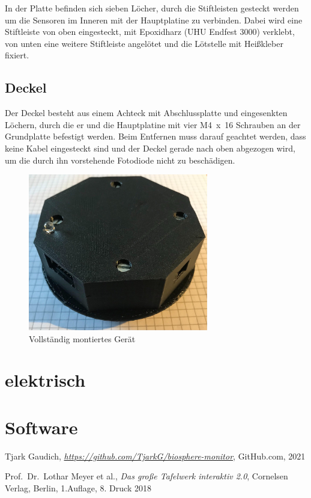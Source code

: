 \documentclass[12pt, a4paper, oneside]{report}
\begin{document}
In der Platte befinden sich sieben Löcher, durch die Stiftleisten gesteckt werden um die Sensoren im Inneren mit der Hauptplatine zu verbinden. Dabei wird eine Stiftleiste von oben eingesteckt, mit Epoxidharz (UHU Endfest 3000) verklebt, von unten eine weitere Stiftleiste angelötet und die Lötstelle mit Heißkleber fixiert.

\section{Deckel}
Der Deckel besteht aus einem Achteck mit Abschlussplatte und eingesenkten Löchern, durch die er und die Hauptplatine mit vier M4~x~16 Schrauben an der Grundplatte befestigt werden. Beim Entfernen muss darauf geachtet werden, dass keine Kabel eingesteckt sind und der Deckel gerade nach oben abgezogen wird, um die durch ihn vorstehende Fotodiode nicht zu beschädigen.
\\
\begin{figure}[h]
	\centering
	\includegraphics[width=0.7\textwidth]{pic/Komplett}
	\caption{Vollständig montiertes Gerät}
	\label{fig:Komplett}
\end{figure}

\chapter{elektrisch}
\label{ch:elektrisch}
\chapter{Software}

\begin{thebibliography}{9}

  Tjark Gaudich,
  \textit{\url{https://github.com/TjarkG/biosphere-monitor}},
  GitHub.com,
  2021
  
  Prof.~Dr.~Lothar Meyer et al.,
  \textit{Das große Tafelwerk interaktiv 2.0},
  Cornelsen Verlag, Berlin,
  1.Auflage, 8. Druck 2018

\end{thebibliography}
\end{document}
